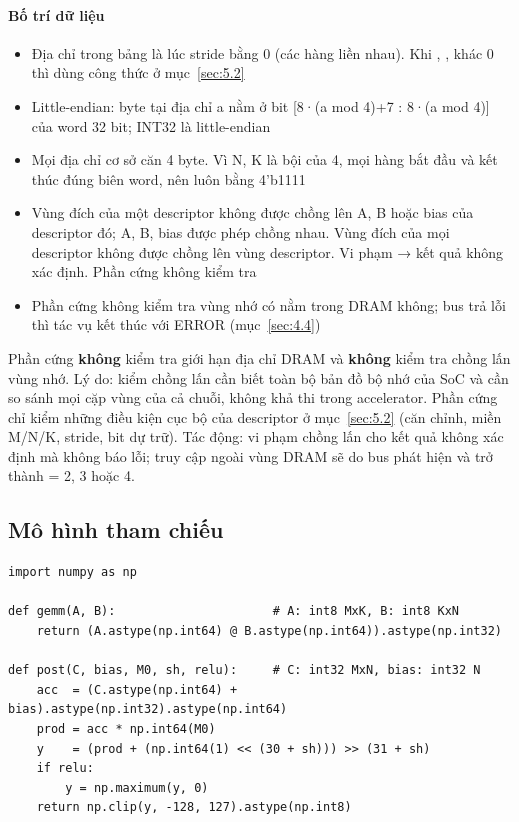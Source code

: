 \paragraph{Bố trí dữ liệu}\label{par:3-6}
\begin{itemize}
\item Địa chỉ trong bảng là lúc stride bằng 0 (các hàng liền nhau). Khi , ,  khác 0 thì dùng công thức ở mục~\ref{sec:5.2}
\item Little-endian: byte tại địa chỉ a nằm ở bit [8·(a mod 4)+7 : 8·(a mod 4)] của word 32 bit; INT32 là little-endian
\item Mọi địa chỉ cơ sở căn 4 byte. Vì N, K là bội của 4, mọi hàng bắt đầu và kết thúc đúng biên word, nên  luôn bằng 4'b1111
\item Vùng đích của một descriptor không được chồng lên A, B hoặc bias của descriptor đó; A, B, bias được phép chồng nhau. Vùng đích của mọi descriptor không được chồng lên vùng descriptor. Vi phạm → kết quả không xác định. Phần cứng không kiểm tra
\item Phần cứng không kiểm tra vùng nhớ có nằm trong DRAM không; bus trả lỗi thì tác vụ kết thúc với ERROR (mục~\ref{sec:4.4})
\end{itemize}

\begin{notebox}
Phần cứng \textbf{không} kiểm tra giới hạn địa chỉ DRAM và \textbf{không} kiểm tra chồng lấn vùng
nhớ. Lý do: kiểm chồng lấn cần biết toàn bộ bản đồ bộ nhớ của SoC và cần so sánh mọi cặp vùng của
cả chuỗi, không khả thi trong accelerator. Phần cứng chỉ kiểm những điều kiện cục bộ của descriptor
ở mục~\ref{sec:5.2} (căn chỉnh, miền M/N/K, stride, bit dự trữ). Tác động: vi phạm chồng lấn cho
kết quả không xác định mà không báo lỗi; truy cập ngoài vùng DRAM sẽ do bus phát hiện và trở thành
 = 2, 3 hoặc 4.
\end{notebox}

\subsection{Mô hình tham chiếu}\label{sec:3.5}

\begin{Verbatim}[frame=leftline,framerule=2pt,rulecolor=\color{brand},xleftmargin=6pt,samepage=true]
import numpy as np

def gemm(A, B):                      # A: int8 MxK, B: int8 KxN
    return (A.astype(np.int64) @ B.astype(np.int64)).astype(np.int32)

def post(C, bias, M0, sh, relu):     # C: int32 MxN, bias: int32 N
    acc  = (C.astype(np.int64) + bias).astype(np.int32).astype(np.int64)
    prod = acc * np.int64(M0)
    y    = (prod + (np.int64(1) << (30 + sh))) >> (31 + sh)
    if relu:
        y = np.maximum(y, 0)
    return np.clip(y, -128, 127).astype(np.int8)
\end{Verbatim}

